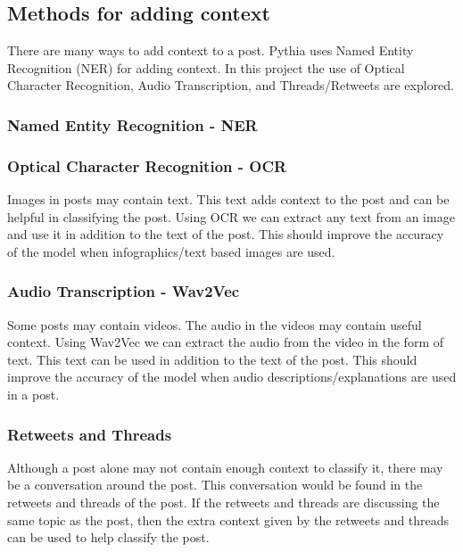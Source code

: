 \subsection{Methods for adding context}
There are many ways to add context to a post. Pythia uses Named Entity Recognition (NER) for adding context. In this project the use
of Optical Character Recognition, Audio Transcription, and Threads/Retweets are explored.
\subsubsection{Named Entity Recognition - NER}
\subsubsection{Optical Character Recognition - OCR}
Images in posts may contain text. This text adds context to the post and can be helpful in classifying the post.
Using OCR we can extract any text from an image and use it in addition to the text of the post. This should improve the accuracy of the
model when infographics/text based images are used.
\subsubsection{Audio Transcription - Wav2Vec}
Some posts may contain videos. The audio in the videos may contain useful context. Using Wav2Vec we can extract the audio from the video
in the form of text. This text can be used in addition to the text of the post. This should improve the accuracy of the model when audio
descriptions/explanations are used in a post.
\subsubsection{Retweets and Threads}
Although a post alone may not contain enough context to classify it, there may be a conversation around the post. This conversation 
would be found in the retweets and threads of the post. If the retweets and threads are discussing the same topic as the post, then the
extra context given by the retweets and threads can be used to help classify the post.

